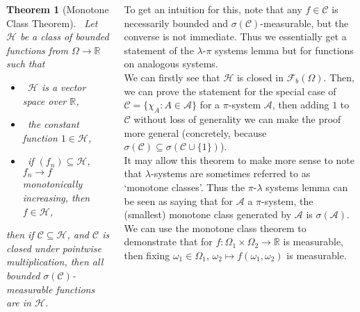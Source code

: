 \documentclass{tikzposter} %
\newtheorem{theorem}{Theorem}
\begin{document}
\begin{columns}
{    \begin{theorem}[Monotone Class Theorem]
      \ Let $\mathcal{H}$ be a class of bounded functions from $\Omega \to \mathbb{R}$ such that
      \begin{itemize}
              \item \ $\mathcal{H}$ is a vector space over $\mathbb{R}$,
              \item \ the constant function $1 \in \mathcal{H}$,
              \item \ if $(f_{n}) \subseteq \mathcal{H}$, $f_{n} \to f$ monotonically increasing, then $f \in \mathcal{H}$,
      \end{itemize}
      then if $\mathcal{C} \subseteq \mathcal{H}$, and $\mathcal{C}$ is closed under pointwise multiplication, then all bounded $\sigma(\mathcal{C})$-measurable functions are in $\mathcal{H}$.
    \end{theorem}
    \hphantom{}

    To get an intuition for this, note that any $f \in \mathcal{C}$ is necessarily bounded and $\sigma(\mathcal{C})$-measurable, but the converse is not immediate. Thus we essentially get a statement of the $\lambda$-$\pi$ systems lemma but for functions on analogous systems. \\

    We can firstly see that $\mathcal{H}$ is closed in $\mathcal{F}_{b}(\Omega)$. Then, we can prove the statement for the special case of $\mathcal{C} = \{\chi_{A} : A \in \mathcal{A}\}$ for a $\pi$-system $\mathcal{A}$, then adding $1$ to $\mathcal{C}$ without loss of generality we can make the proof more general (concretely, because $\sigma(\mathcal{C}) \subseteq \sigma(\mathcal{C} \cup \{1\})$). \\

    It may allow this theorem to make more sense to note that $\lambda$-systems are sometimes referred to as `monotone classes'. Thus the $\pi$-$\lambda$ systems lemma can be seen as saying that for $\mathcal{A}$ a $\pi$-system, the (smallest) monotone class generated by $\mathcal{A}$ is $\sigma(\mathcal{A})$. \\

    We can use the monotone class theorem to demonstrate that for $f : \Omega_{1} \times \Omega_{2} \to \mathbb{R}$ is measurable, then fixing $\omega_{1} \in \Omega_{1}$, $\omega_{2} \mapsto f(\omega_{1}, \omega_{2})$ is measurable.
  }
\end{columns}
\end{document}
